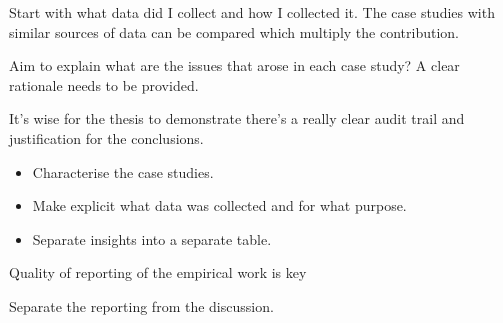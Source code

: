 Start with what data did I collect and how I collected it. The case studies with similar sources of data can be compared which multiply the contribution.

Aim to explain what are the issues that arose in each case study?
A clear rationale needs to be provided. 

It's wise for the thesis to demonstrate there's a really clear audit trail and justification for the conclusions.

\begin{itemize}
    \item Characterise the case studies.
    \item Make explicit what data was collected and for what purpose. 
    \item Separate insights into a separate table. 
\end{itemize}

Quality of reporting of the empirical work is key


Separate the reporting from the discussion.

